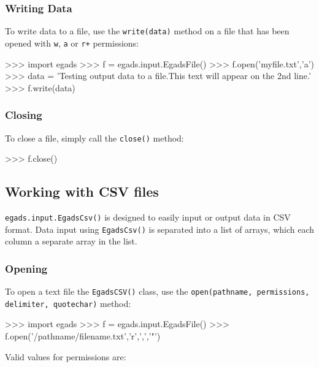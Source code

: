 \documentclass[a4paper,11pt]{report}
\begin{document}
\subsubsection{Writing Data}

To write data to a file, use the \verb|write(data)| method on a file that has been opened with
\verb|w|, \verb|a| or \verb|r+| permissions:

\begin{command}
   >>> import egads
   >>> f = egads.input.EgadsFile()
   >>> f.open('myfile.txt','a')
   >>> data = 'Testing output data to a file.\n This text will appear on the 2nd line.'
   >>> f.write(data) 
\end{command}

\subsubsection{Closing}

To close a file, simply call the \verb|close()| method:

\begin{command}
   >>> f.close()
\end{command}





\subsection{Working with CSV files}

\verb|egads.input.EgadsCsv()| is designed to easily input or output data in CSV format.
Data input using \verb|EgadsCsv()| is separated into a list of arrays, which each column a separate
array in the list. 

\subsubsection{Opening}

To open a text file the \verb|EgadsCSV()| class, use the
\verb|open(pathname, permissions, delimiter, quotechar)| method:

\begin{command}
    >>> import egads
    >>> f = egads.input.EgadsFile()
    >>> f.open('/pathname/filename.txt','r',',','"')
\end{command}
%
Valid values for permissions are:
\end{document}
